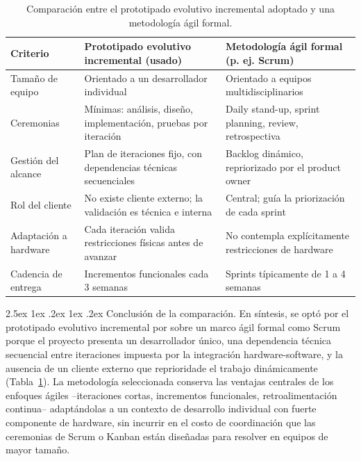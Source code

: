 \documentclass{iccmemoria}
\makeatletter
\renewcommand\paragraph{%
  \@startsection{paragraph}{4}{0pt}%
    {2.5ex \@plus 1ex \@minus .2ex}%
    {1ex \@plus .2ex}%
    {\normalfont\normalsize\bfseries}}
\makeatother
\begin{document}
\begin{table}[H]
\centering
\small
\begin{tabular}{|l|p{5.2cm}|p{5.2cm}|}
\hline
\textbf{Criterio} & \textbf{Prototipado evolutivo incremental (usado)} & \textbf{Metodología ágil formal (p. ej. Scrum)} \\
\hline
Tamaño de equipo & Orientado a un desarrollador individual & Orientado a equipos multidisciplinarios \\
\hline
Ceremonias & Mínimas: análisis, diseño, implementación, pruebas por iteración & Daily stand-up, sprint planning, review, retrospectiva \\
\hline
Gestión del alcance & Plan de iteraciones fijo, con dependencias técnicas secuenciales & Backlog dinámico, repriorizado por el product owner \\
\hline
Rol del cliente & No existe cliente externo; la validación es técnica e interna & Central; guía la priorización de cada sprint \\
\hline
Adaptación a hardware & Cada iteración valida restricciones físicas antes de avanzar & No contempla explícitamente restricciones de hardware \\
\hline
Cadencia de entrega & Incrementos funcionales cada 3 semanas & Sprints típicamente de 1 a 4 semanas \\
\hline
\end{tabular}
\caption{Comparación entre el prototipado evolutivo incremental adoptado y una metodología ágil formal.}
\label{tab:comparacion_metodologias}
\end{table}

\paragraph{Conclusión de la comparación.} En síntesis, se optó por el prototipado evolutivo incremental por sobre un marco ágil formal como Scrum porque el proyecto presenta un desarrollador único, una dependencia técnica secuencial entre iteraciones impuesta por la integración hardware-software, y la ausencia de un cliente externo que reprioridade el trabajo dinámicamente (Tabla~\ref{tab:comparacion_metodologias}). La metodología seleccionada conserva las ventajas centrales de los enfoques ágiles --iteraciones cortas, incrementos funcionales, retroalimentación continua-- adaptándolas a un contexto de desarrollo individual con fuerte componente de hardware, sin incurrir en el costo de coordinación que las ceremonias de Scrum o Kanban están diseñadas para resolver en equipos de mayor tamaño.
\end{document}
